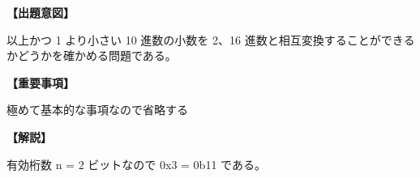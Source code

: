 \noindent \textbf{【出題意図】}

 以上かつ 1 より小さい 10 進数の小数を 2、16 進数と相互変換することができるかどうかを確かめる問題である。

\vspace{1em}
\noindent \textbf{【重要事項】}

\noindent 極めて基本的な事項なので省略する

\vspace{1em}
\noindent \textbf{【解説】}

\noindent 有効桁数 n = 2 ビットなので 0x3 = 0b11 である。
